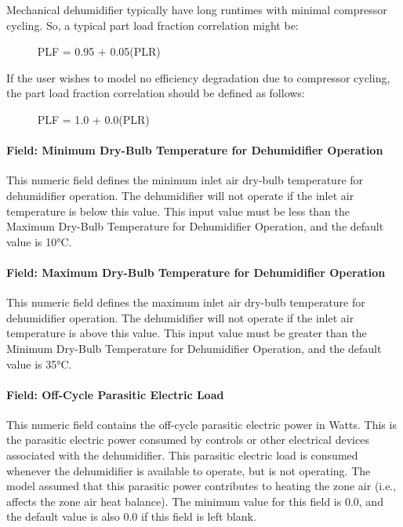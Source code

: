 Mechanical dehumidifier typically have long runtimes with minimal compressor cycling. So, a typical part load fraction correlation might be:

~~~~~ PLF = 0.95 + 0.05(PLR)

If the user wishes to model no efficiency degradation due to compressor cycling, the part load fraction correlation should be defined as follows:

~~~~~ PLF = 1.0 + 0.0(PLR)

\paragraph{Field: Minimum Dry-Bulb Temperature for Dehumidifier Operation}\label{field-minimum-dry-bulb-temperature-for-dehumidifier-operation}

This numeric field defines the minimum inlet air dry-bulb temperature for dehumidifier operation. The dehumidifier will not operate if the inlet air temperature is below this value. This input value must be less than the Maximum Dry-Bulb Temperature for Dehumidifier Operation, and the default value is 10\si{\degreeCelsius}.

\paragraph{Field: Maximum Dry-Bulb Temperature for Dehumidifier Operation}\label{field-maximum-dry-bulb-temperature-for-dehumidifier-operation}

This numeric field defines the maximum inlet air dry-bulb temperature for dehumidifier operation. The dehumidifier will not operate if the inlet air temperature is above this value. This input value must be greater than the Minimum Dry-Bulb Temperature for Dehumidifier Operation, and the default value is 35\si{\degreeCelsius}.

\paragraph{Field: Off-Cycle Parasitic Electric Load}\label{field-off-cycle-parasitic-electric-load-001}

This numeric field contains the off-cycle parasitic electric power in Watts. This is the parasitic electric power consumed by controls or other electrical devices associated with the dehumidifier. This parasitic electric load is consumed whenever the dehumidifier is available to operate, but is not operating. The model assumed that this parasitic power contributes to heating the zone air (i.e., affects the zone air heat balance). The minimum value for this field is 0.0, and the default value is also 0.0 if this field is left blank.

